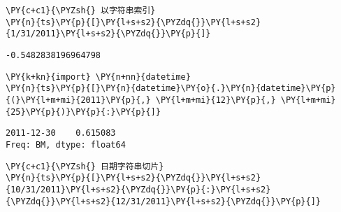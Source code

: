     \begin{tcolorbox}[breakable, size=fbox, boxrule=1pt, pad at break*=1mm,colback=cellbackground, colframe=cellborder]
\begin{Verbatim}[commandchars=\\\{\}]
\PY{c+c1}{\PYZsh{} 以字符串索引}
\PY{n}{ts}\PY{p}{[}\PY{l+s+s2}{\PYZdq{}}\PY{l+s+s2}{1/31/2011}\PY{l+s+s2}{\PYZdq{}}\PY{p}{]}
\end{Verbatim}
\end{tcolorbox}

            \begin{tcolorbox}[breakable, size=fbox, boxrule=.5pt, pad at break*=1mm, opacityfill=0]
\begin{Verbatim}[commandchars=\\\{\}]
-0.5482838196964798
\end{Verbatim}
\end{tcolorbox}
        
    \begin{tcolorbox}[breakable, size=fbox, boxrule=1pt, pad at break*=1mm,colback=cellbackground, colframe=cellborder]
\begin{Verbatim}[commandchars=\\\{\}]
\PY{k+kn}{import} \PY{n+nn}{datetime}
\PY{n}{ts}\PY{p}{[}\PY{n}{datetime}\PY{o}{.}\PY{n}{datetime}\PY{p}{(}\PY{l+m+mi}{2011}\PY{p}{,} \PY{l+m+mi}{12}\PY{p}{,} \PY{l+m+mi}{25}\PY{p}{)}\PY{p}{:}\PY{p}{]}
\end{Verbatim}
\end{tcolorbox}

            \begin{tcolorbox}[breakable, size=fbox, boxrule=.5pt, pad at break*=1mm, opacityfill=0]
\begin{Verbatim}[commandchars=\\\{\}]
2011-12-30    0.615083
Freq: BM, dtype: float64
\end{Verbatim}
\end{tcolorbox}
        
    \begin{tcolorbox}[breakable, size=fbox, boxrule=1pt, pad at break*=1mm,colback=cellbackground, colframe=cellborder]
\begin{Verbatim}[commandchars=\\\{\}]
\PY{c+c1}{\PYZsh{} 日期字符串切片}
\PY{n}{ts}\PY{p}{[}\PY{l+s+s2}{\PYZdq{}}\PY{l+s+s2}{10/31/2011}\PY{l+s+s2}{\PYZdq{}}\PY{p}{:}\PY{l+s+s2}{\PYZdq{}}\PY{l+s+s2}{12/31/2011}\PY{l+s+s2}{\PYZdq{}}\PY{p}{]}
\end{Verbatim}
\end{tcolorbox}

